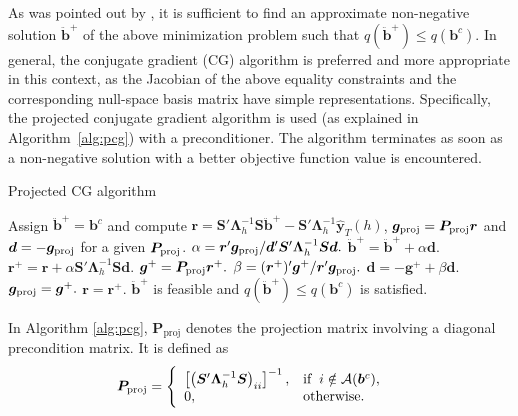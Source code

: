 \documentclass[11pt]{article}
\newcommand{\0}{\phantom{0}}
\begin{document}
As was pointed out by \citet{Nocedal2006}, it is sufficient to find an approximate non-negative solution $\ddot{\bm{b}}^{+}$ of the above minimization problem such that $q(\ddot{\bm{b}}^{+}) \leq q(\bm{b}^{c})$. In general, the conjugate gradient (CG) algorithm is preferred and more appropriate in this context, as the Jacobian of the above equality constraints and the corresponding null-space basis matrix have simple representations. Specifically, the projected conjugate gradient algorithm is used (as explained in Algorithm~\ref{alg:pcg}) with a preconditioner. The algorithm terminates as soon as a non-negative solution with a better objective function value is encountered.

\begin{algorithm}
	\caption{Projected CG algorithm}
	\label{alg:pcg}
	\begin{spacing}{1.3}
		\begin{algorithmic}[1]
			\Require Assign $\ddot{\bm{b}}^{+} = \bm{b}^{c}$ and compute $\bm{r} = \bm{S}'\bm{\Lambda}^{-1}_{h}\bm{S}\ddot{\bm{b}}^{+} - \bm{S}'\bm{\Lambda}^{-1}_{h}\hat{\bm{y}}_{T}(h)$, $\bm{g}_{\textnormal{proj}} = \bm{P}_{\tiny \textnormal{proj}}\bm{r}$ and $\bm{d} = -\bm{g}_{\textnormal{proj}}$ for a given $\bm{P}_{\tiny \textnormal{proj}}$. 
			\Repeat
			\State $\alpha = \bm{r}'\bm{g}_{\textnormal{proj}} / \bm{d}'\bm{S}'\bm{\Lambda}_{h}^{-1}\bm{S} \bm{d}.$
			\State $\ddot{\bm{b}}^{+} = \ddot{\bm{b}}^{+} + \alpha \bm{d}.$
			\State $\bm{r}^{+} = \bm{r} + \alpha \bm{S}'\bm{\Lambda}_{h}^{-1}\bm{S} \bm{d}.$
			\State $\bm{g}^{+} = \bm{P}_{\tiny \textnormal{proj}}\bm{r}^{+}.$
			\State $\beta = (\bm{r}^{+})'\bm{g}^{+} / \bm{r}'\bm{g}_{\textnormal{proj}}.$
			\State $\bm{d} = -\bm{g}^{+} + \beta \bm{d}.$
			\State $\bm{g}_{\textnormal{proj}} = \bm{g}^{+}.$
			\State $\bm{r} = \bm{r}^{+}.$			
			\Until $\ddot{\bm{b}}^{+}$ is feasible and $q(\ddot{\bm{b}}^{+}) \leq q(\bm{b}^{c})$ is satisfied.
		\end{algorithmic}
	\end{spacing}
\end{algorithm}

In Algorithm \ref{alg:pcg}, $\bm{P}_{\text{proj}}$ denotes the projection matrix involving a diagonal precondition matrix. It is defined as
\begin{align*}
\bm{P}_{\text{proj}} & =
\left\{\begin{array}{ll}
\left[\left(\bm{S}'\bm{\Lambda}_{h}^{-1}\bm{S}\right)_{ii}\right]^{-1}, & \mbox{$\text{if} \hspace{2mm} i \notin \mathcal{A}(\bm{b}^{c}),$}\\
0, & \mbox{$\text{otherwise}$}.
\end{array}\right.
\end{align*}
\end{document}
